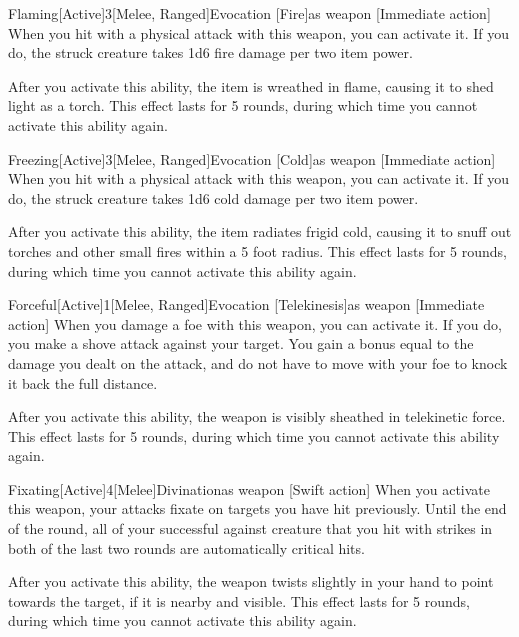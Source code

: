         \begin{magicitemdef}{Flaming}[Active]{3}[Melee, Ranged]{Evocation [Fire]}{as weapon}
            [Immediate action] When you hit with a physical attack with this weapon, you can activate it.
            If you do, the struck creature takes 1d6 fire damage per two item power.

            After you activate this ability, the item is wreathed in flame, causing it to shed light as a torch.
            This effect lasts for 5 rounds, during which time you cannot activate this ability again.
        \end{magicitemdef}

        \begin{magicitemdef}{Freezing}[Active]{3}[Melee, Ranged]{Evocation [Cold]}{as weapon}
            [Immediate action] When you hit with a physical attack with this weapon, you can activate it.
            If you do, the struck creature takes 1d6 cold damage per two item power.

            After you activate this ability, the item radiates frigid cold, causing it to snuff out torches and other small fires within a 5 foot radius.
            This effect lasts for 5 rounds, during which time you cannot activate this ability again.
        \end{magicitemdef}

        \begin{magicitemdef}{Forceful}[Active]{1}[Melee, Ranged]{Evocation [Telekinesis]}{as weapon}
            [Immediate action] When you damage a foe with this weapon, you can activate it.
            If you do, you make a shove attack against your target.
            You gain a bonus equal to the damage you dealt on the attack, and do not have to move with your foe to knock it back the full distance.

            After you activate this ability, the weapon is visibly sheathed in telekinetic force.
            This effect lasts for 5 rounds, during which time you cannot activate this ability again.
        \end{magicitemdef}

        \begin{magicitemdef}{Fixating}[Active]{4}[Melee]{Divination}{as weapon}
            [Swift action] When you activate this weapon, your attacks fixate on targets you have hit previously.
            Until the end of the round, all of your successful  against creature that you hit with strikes in both of the last two rounds are automatically critical hits.

            After you activate this ability, the weapon twists slightly in your hand to point towards the target, if it is nearby and visible.
            This effect lasts for 5 rounds, during which time you cannot activate this ability again.
        \end{magicitemdef}

